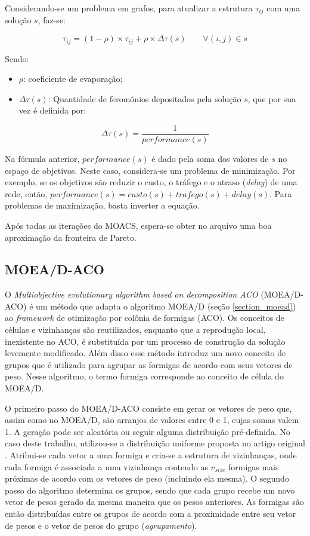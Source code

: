 Considerando-se um problema em grafos, para atualizar a estrutura $\tau_{ij}$ com uma solução $s$, faz-se:

\begin{equation}\tau_{ij} = (1 - \rho) \times \tau_{ij} + \rho \times \Delta\tau(s) \qquad \forall(i,j) \in s\end{equation}

Sendo:
\begin{itemize} 
	\item $\rho$: coeficiente de evaporação;
	\item $\Delta\tau(s)$: Quantidade de feromônios depositados pela solução $s$, que por sua vez é definida por:
\end{itemize}

\begin{equation}\Delta\tau(s) = \frac{1}{performance(s)}\end{equation}

Na fórmula anterior, $performance(s)$ é dado pela soma dos valores de $s$ no espaço de objetivos. Neste caso, considera-se um problema de minimização. Por exemplo, se os objetivos são reduzir o custo, o tráfego e o atraso (\textit{delay}) de uma rede, então, $performance(s) = custo(s) + trafego(s) + delay(s)$. Para problemas de maximização, basta inverter a equação.

Após todas as iterações do MOACS, espera-se obter no arquivo uma boa aproximação da fronteira de Pareto. 

\subsection{MOEA/D-ACO}
O \textit{Multiobjective evolutionary algorithm based on decomposition ACO} (MOEA/D-ACO) \cite{Ke2013} é um método que adapta o algoritmo MOEA/D (seção \ref{section_moead}) ao \textit{framework} de otimização por colônia de formigas (ACO). Os conceitos de células e vizinhanças são reutilizados, enquanto que a reprodução local, inexistente no ACO, é substituída por um processo de construção da solução levemente modificado. Além disso esse método introduz um novo conceito de grupos que é utilizado para agrupar as formigas de acordo com seus vetores de peso. Nesse algoritmo, o termo formiga corresponde ao conceito de célula do MOEA/D.

O primeiro passo do MOEA/D-ACO consiste em gerar os vetores de peso que, assim como no MOEA/D, são arranjos de valores entre 0 e 1, cujas somas valem 1. A geração pode ser aleatória ou seguir alguma distribuição pré-definida. No caso deste trabalho, utilizou-se a distribuição uniforme proposta no artigo original \cite{Ke2013}. Atribui-se cada vetor a uma formiga e cria-se a estrutura de vizinhanças, onde cada formiga é associada a uma vizinhança contendo as $v_{size}$ formigas mais próximas de acordo com os vetores de peso (incluindo ela mesma). O segundo passo do algoritmo determina os grupos, sendo que cada grupo recebe um novo vetor de pesos gerado da mesma maneira que os pesos anteriores. As formigas são então distribuídas entre os grupos de acordo com a proximidade entre seu vetor de pesos e o vetor de pesos do grupo (\textit{agrupamento}).

